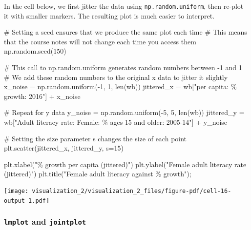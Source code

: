 \documentclass[
  letterpaper,
  DIV=11,
  numbers=noendperiod]{scrreprt}
\newenvironment{Shaded}{\begin{snugshade}}{\end{snugshade}}
\newcommand{\BuiltInTok}[1]{\textcolor[rgb]{0.00,0.23,0.31}{#1}}
\newcommand{\CommentTok}[1]{\textcolor[rgb]{0.37,0.37,0.37}{#1}}
\newcommand{\DecValTok}[1]{\textcolor[rgb]{0.68,0.00,0.00}{#1}}
\newcommand{\NormalTok}[1]{\textcolor[rgb]{0.00,0.23,0.31}{#1}}
\newcommand{\OperatorTok}[1]{\textcolor[rgb]{0.37,0.37,0.37}{#1}}
\newcommand{\SpecialCharTok}[1]{\textcolor[rgb]{0.37,0.37,0.37}{#1}}
\newcommand{\StringTok}[1]{\textcolor[rgb]{0.13,0.47,0.30}{#1}}
\begin{document}
In the cell below, we first jitter the data using
\texttt{np.random.uniform}, then re-plot it with smaller markers. The
resulting plot is much easier to interpret.

\begin{Shaded}
\begin{Highlighting}[]
\CommentTok{\# Setting a seed ensures that we produce the same plot each time}
\CommentTok{\# This means that the course notes will not change each time you access them}
\NormalTok{np.random.seed(}\DecValTok{150}\NormalTok{)}

\CommentTok{\# This call to np.random.uniform generates random numbers between {-}1 and 1}
\CommentTok{\# We add these random numbers to the original x data to jitter it slightly}
\NormalTok{x\_noise }\OperatorTok{=}\NormalTok{ np.random.uniform(}\OperatorTok{{-}}\DecValTok{1}\NormalTok{, }\DecValTok{1}\NormalTok{, }\BuiltInTok{len}\NormalTok{(wb))}
\NormalTok{jittered\_x }\OperatorTok{=}\NormalTok{ wb[}\StringTok{"per capita: }\SpecialCharTok{\% g}\StringTok{rowth: 2016"}\NormalTok{] }\OperatorTok{+}\NormalTok{ x\_noise}

\CommentTok{\# Repeat for y data}
\NormalTok{y\_noise }\OperatorTok{=}\NormalTok{ np.random.uniform(}\OperatorTok{{-}}\DecValTok{5}\NormalTok{, }\DecValTok{5}\NormalTok{, }\BuiltInTok{len}\NormalTok{(wb))}
\NormalTok{jittered\_y }\OperatorTok{=}\NormalTok{ wb[}\StringTok{"Adult literacy rate: Female: \% ages 15 and older: 2005{-}14"}\NormalTok{] }\OperatorTok{+}\NormalTok{ y\_noise}

\CommentTok{\# Setting the size parameter \textasciigrave{}s\textasciigrave{} changes the size of each point}
\NormalTok{plt.scatter(jittered\_x, jittered\_y, s}\OperatorTok{=}\DecValTok{15}\NormalTok{)}

\NormalTok{plt.xlabel(}\StringTok{"}\SpecialCharTok{\% g}\StringTok{rowth per capita (jittered)"}\NormalTok{)}
\NormalTok{plt.ylabel(}\StringTok{"Female adult literacy rate (jittered)"}\NormalTok{)}
\NormalTok{plt.title(}\StringTok{"Female adult literacy against }\SpecialCharTok{\% g}\StringTok{rowth"}\NormalTok{)}\OperatorTok{;}
\end{Highlighting}
\end{Shaded}

\texttt{[image: visualization\_2/visualization\_2\_files/figure-pdf/cell-16-output-1.pdf]}

\subsubsection{\texorpdfstring{\texttt{lmplot} and
\texttt{jointplot}}{lmplot and jointplot}}\label{lmplot-and-jointplot}
\end{document}
